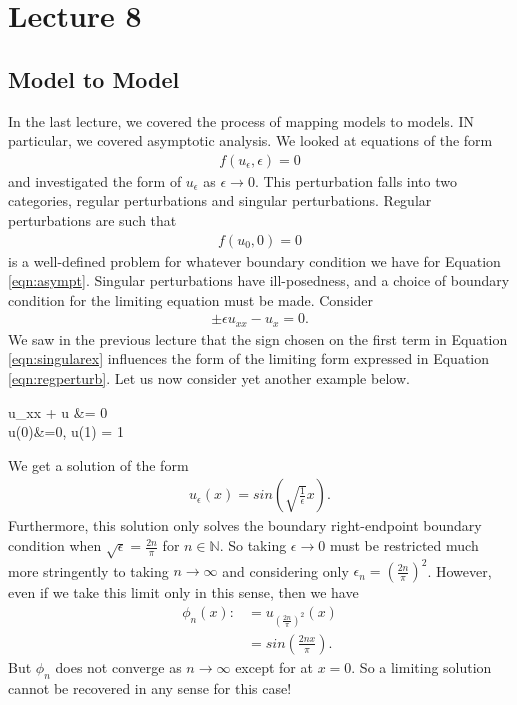 \chapter{Lecture 8}
\section{Model to Model}
In the last lecture, we covered the process of mapping models to models. IN particular, we covered asymptotic analysis. We looked at equations of the form
\begin{align} \label{eqn:asympt}
    f(u_{\epsilon}, \epsilon) = 0
\end{align}
and investigated the form of $u_{\epsilon}$ as $\epsilon \to 0$. This perturbation falls into two categories, regular perturbations and singular perturbations. Regular perturbations are such that
\begin{align} \label{eqn:regperturb}
f(u_{0}, 0) = 0
\end{align}
is a well-defined problem for whatever boundary condition we have for Equation \ref{eqn:asympt}. Singular perturbations have ill-posedness, and a choice of boundary condition for the limiting equation must be made. Consider
\begin{align} \label{eqn:singularex}
\pm \epsilon u_{xx} - u_{x} = 0.
\end{align}
We saw in the previous lecture that the sign chosen on the first term in Equation \ref{eqn:singularex} influences the form of the limiting form expressed in Equation \ref{eqn:regperturb}. Let us now consider yet another example below.
\begin{ceqn} \label{eqn:singex2}
\epsilon u_{xx} + u &= 0 \\
u(0)&=0, u(1) = 1
\end{ceqn}
We get a solution of the form
\begin{align} \label{eqn:singex2soln}
u_{\epsilon}(x) = sin\left(\sqrt{\frac{1}{\epsilon}} x\right).
\end{align}
Furthermore, this solution only solves the boundary right-endpoint boundary condition when $\sqrt{\epsilon} = \frac{2n}{\pi}$ for $n \in \mathbb{N}$. So taking $\epsilon \to 0$ must be restricted much more stringently to taking $n \to \infty$ and considering only $\epsilon_{n} = \left(\frac{2n}{\pi}\right)^{2}$. However, even if we take this limit only in this sense, then we have
\begin{align} \label{eqn:singex2soln2}
    \phi_{n}(x) :&= u_{\left(\frac{2n}{\pi}\right)^2}(x) \\
    &= sin\left(\frac{2nx}{\pi}\right).
\end{align}
But $\phi_n$ does not converge as $n \to \infty$ except for at $x=0$. So a limiting solution cannot be recovered in any sense for this case! 

